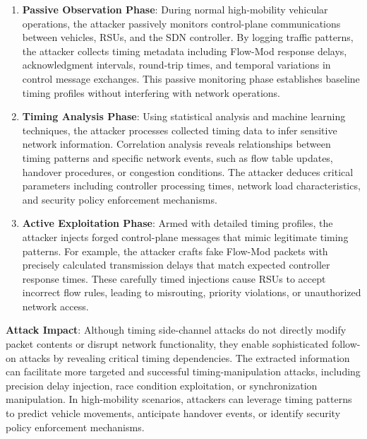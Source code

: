 \begin{enumerate}
    \item \textbf{Passive Observation Phase}: During normal high-mobility vehicular operations, the attacker passively monitors control-plane communications between vehicles, RSUs, and the SDN controller. By logging traffic patterns, the attacker collects timing metadata including Flow-Mod response delays, acknowledgment intervals, round-trip times, and temporal variations in control message exchanges. This passive monitoring phase establishes baseline timing profiles without interfering with network operations.
    
    \item \textbf{Timing Analysis Phase}: Using statistical analysis and machine learning techniques, the attacker processes collected timing data to infer sensitive network information. Correlation analysis reveals relationships between timing patterns and specific network events, such as flow table updates, handover procedures, or congestion conditions. The attacker deduces critical parameters including controller processing times, network load characteristics, and security policy enforcement mechanisms.
    
    \item \textbf{Active Exploitation Phase}: Armed with detailed timing profiles, the attacker injects forged control-plane messages that mimic legitimate timing patterns. For example, the attacker crafts fake Flow-Mod packets with precisely calculated transmission delays that match expected controller response times. These carefully timed injections cause RSUs to accept incorrect flow rules, leading to misrouting, priority violations, or unauthorized network access.
\end{enumerate}

\textbf{Attack Impact}: Although timing side-channel attacks do not directly modify packet contents or disrupt network functionality, they enable sophisticated follow-on attacks by revealing critical timing dependencies. The extracted information can facilitate more targeted and successful timing-manipulation attacks, including precision delay injection, race condition exploitation, or synchronization manipulation. In high-mobility scenarios, attackers can leverage timing patterns to predict vehicle movements, anticipate handover events, or identify security policy enforcement mechanisms.


